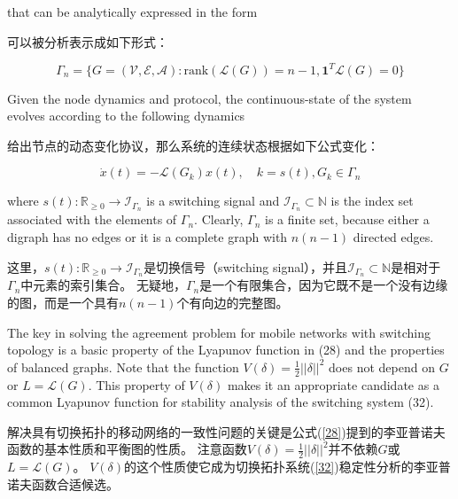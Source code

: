 \documentclass{article}
\begin{document}
{\color[gray]{0.5}
\noindent that can be analytically expressed in the form
}

\noindent 可以被分析表示成如下形式：

\begin{equation}
    \Gamma_n = \{ G=(\mathcal{V}, \mathcal{E}, \mathcal{A}): \text{rank}(\mathcal{L}(G)) =n-1, \mathbf{1}^T\mathcal{L}(G) = 0\}
    \tag{31}
    \label{31}
\end{equation}

{\color[gray]{0.5}
\noindent Given the node dynamics and protocol, the continuous-state of the system evolves according to the following dynamics
}

\noindent 给出节点的动态变化协议，那么系统的连续状态根据如下公式变化：

\begin{equation}
    \dot{x}(t) = -\mathcal{L}(G_k)x(t),\quad k=s(t), G_k\in \Gamma_n
    \tag{32}
    \label{32}
\end{equation}

{\color[gray]{0.5}
\noindent where $s(t): \mathbb{R}_{\ge 0}\rightarrow \mathcal{I}_{\Gamma_n}$ is a switching signal and $\mathcal{I}_{\Gamma_n}\subset \mathbb{N}$ is the index set associated with the elements of $\Gamma_n$. 
Clearly, $\Gamma_n$ is a ﬁnite set, because either a digraph has no edges or it is a complete graph with $n(n-1)$ directed edges.
}

\noindent 这里，$s(t): \mathbb{R}_{\ge 0}\rightarrow \mathcal{I}_{\Gamma_n}$是切换信号（switching signal），并且$\mathcal{I}_{\Gamma_n}\subset \mathbb{N}$是相对于$\Gamma_n$中元素的索引集合。
无疑地，$\Gamma_n$是一个有限集合，因为它既不是一个没有边缘的图，而是一个具有$n(n-1)$个有向边的完整图。

{\color[gray]{0.5}
The key in solving the agreement problem for mobile networks with switching topology is a basic property of the Lyapunov function in (28) and the properties of balanced graphs. 
Note that the function $V(\delta)=\frac{1}{2}||\delta||^2$ does not depend on $G$ or $L=\mathcal{L}(G)$. 
This property of $V(\delta)$ makes it an {\color{green}appropriate candidate} as a common Lyapunov function for stability analysis of the switching system (32).
}

解决具有切换拓扑的移动网络的一致性问题的关键是公式(\ref{28})提到的李亚普诺夫函数的基本性质和平衡图的性质。
注意函数$V(\delta)=\frac{1}{2}||\delta||^2$并不依赖$G$或$L=\mathcal{L}(G)$。
$V(\delta)$的这个性质使它成为切换拓扑系统(\ref{32})稳定性分析的李亚普诺夫函数合适候选。
\end{document}
